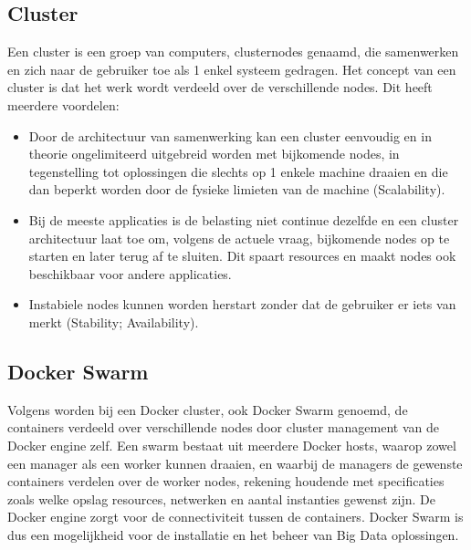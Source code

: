 \subsection{Cluster}
Een cluster is een groep van computers, clusternodes genaamd, die samenwerken en zich naar de gebruiker toe als 1 enkel systeem gedragen. Het concept van een cluster is dat het werk wordt verdeeld over de verschillende nodes.
Dit heeft meerdere voordelen:
\newline
\begin{itemize}
    \item Door de architectuur van samenwerking kan een cluster eenvoudig en in theorie ongelimiteerd uitgebreid worden met bijkomende nodes, in tegenstelling tot oplossingen die slechts op 1 enkele machine draaien en die dan beperkt worden door de fysieke limieten van de machine (Scalability).
    \item Bij de meeste applicaties is de belasting niet continue dezelfde en een cluster architectuur laat toe om, volgens de actuele vraag, bijkomende nodes op te starten en later terug af te sluiten. Dit spaart resources en maakt nodes ook beschikbaar voor andere applicaties.
    \item Instabiele nodes kunnen worden herstart zonder dat de gebruiker er iets van merkt (Stability; Availability).
\end{itemize}

\subsection{Docker Swarm}
Volgens \textcite{Docker2023b} worden bij een Docker cluster, ook Docker Swarm genoemd, de containers verdeeld over verschillende nodes door cluster management van de Docker engine zelf. Een swarm bestaat uit meerdere Docker hosts, waarop zowel een manager als een worker kunnen draaien, en waarbij de managers de gewenste containers verdelen over de worker nodes, rekening houdende met specificaties zoals welke opslag resources, netwerken en aantal instanties gewenst zijn. De Docker engine zorgt voor de connectiviteit tussen de containers.
\newline
\newline
Docker Swarm is dus een mogelijkheid voor de installatie en het beheer van Big Data oplossingen.
\newline
\newline

